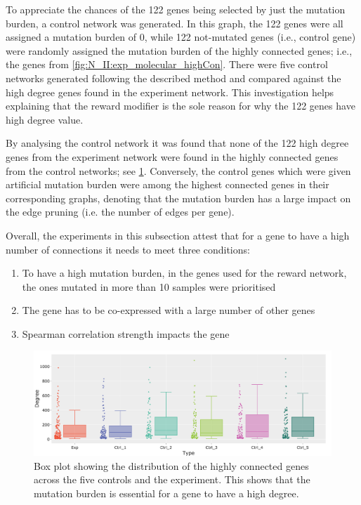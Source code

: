 To appreciate the chances of the 122 genes being selected by just the mutation burden, a control network was generated. In this graph, the 122 genes were all assigned a mutation burden of 0, while 122 not-mutated genes (i.e., control gene) were randomly assigned the mutation burden of the highly connected genes; i.e., the genes from \cref{fig:N_II:exp_molecular_highCon}. There were five control networks generated following the described method and compared against the high degree genes found in the experiment network. This investigation helps explaining that the reward modifier is the sole reason for why the 122 genes have high degree value. 


By analysing the control network it was found that none of the 122 high degree genes from the experiment network were found in the highly connected genes from the control networks; see \cref{fig:N_II:ctrl_box}. Conversely, the control genes which were given artificial mutation burden were among the highest connected genes in their corresponding graphs, denoting that the mutation burden has a large impact on the edge pruning (i.e. the number of edges per gene). 

Overall, the experiments in this subsection attest that for a gene to have a high number of connections it needs to meet three conditions:
\begin{enumerate}
    \item To have a high mutation burden, in the genes used for the reward network, the ones mutated in more than 10 samples were prioritised
    \item The gene has to be co-expressed with a large number of other genes
    \item Spearman correlation strength impacts the gene
\end{enumerate}

\begin{figure}[!htb]    
    \centering
    \includegraphics[width=1.0\textwidth,height=1.0\textheight,keepaspectratio]{Sections/Network_II/resources/reward/ctr_degree.png}
   \caption[The degree of highly connected genes across control networks]{Box plot showing the distribution of the highly connected genes across the five controls and the experiment. This shows that the mutation burden is essential for a gene to have a high degree.}
    \label{fig:N_II:ctrl_box}
\end{figure}


